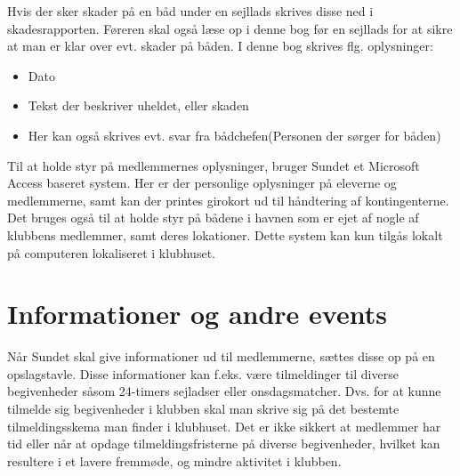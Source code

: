 Hvis der sker skader på en båd under en sejllads skrives disse ned i skadesrapporten. Føreren skal også læse op i denne bog før en sejllads for at sikre at man er klar over evt. skader på båden. I denne bog skrives flg. oplysninger:

\begin{itemize}
	\item Dato
	\item Tekst der beskriver uheldet, eller skaden
	\item Her kan også skrives evt. svar fra bådchefen(Personen der sørger for båden)
\end{itemize}

Til at holde styr på medlemmernes oplysninger, bruger Sundet et Microsoft Access baseret system. Her er der personlige oplysninger på eleverne og medlemmerne, samt kan der printes girokort ud til håndtering af kontingenterne. Det bruges også til at holde styr på bådene i havnen som er ejet af nogle af klubbens medlemmer, samt deres lokationer. Dette system kan kun tilgås lokalt på computeren lokaliseret i klubhuset.

\section{Informationer og andre events}

Når Sundet skal give informationer ud til medlemmerne, sættes disse op på en opslagstavle. Disse informationer kan f.eks. være tilmeldinger til diverse begivenheder såsom 24-timers sejladser eller onsdagsmatcher. Dvs. for at kunne tilmelde sig begivenheder i klubben skal man skrive sig på det bestemte tilmeldingsskema man finder i klubhuset. Det er ikke sikkert at medlemmer har tid eller når at opdage tilmeldingsfristerne på diverse begivenheder, hvilket kan resultere i et lavere fremmøde, og mindre aktivitet i klubben.
